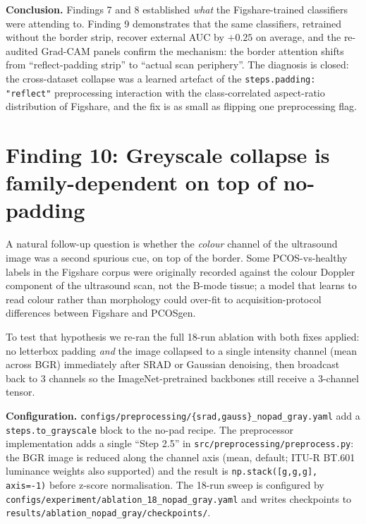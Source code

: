 \documentclass[11pt]{article}
\begin{document}
\textbf{Conclusion.} Findings 7 and 8 established \emph{what} the
Figshare-trained classifiers were attending to. Finding 9 demonstrates
that the same classifiers, retrained without the border strip, recover
external AUC by $+0.25$ on average, and the re-audited Grad-CAM
panels confirm the mechanism: the border attention shifts from
``reflect-padding strip'' to ``actual scan periphery''. The diagnosis
is closed: the cross-dataset collapse was a learned artefact of the
\texttt{steps.padding: "reflect"} preprocessing interaction with the
class-correlated aspect-ratio distribution of Figshare, and the fix is
as small as flipping one preprocessing flag.

\clearpage

\section{Finding 10: Greyscale collapse is family-dependent on top of no-padding}
\label{sec:no-pad-gray}

A natural follow-up question is whether the \emph{colour} channel of
the ultrasound image was a second spurious cue, on top of the border.
Some PCOS-vs-healthy labels in the Figshare corpus were originally
recorded against the colour Doppler component of the ultrasound scan,
not the B-mode tissue; a model that learns to read colour rather than
morphology could over-fit to acquisition-protocol differences between
Figshare and PCOSgen.

To test that hypothesis we re-ran the full 18-run ablation with both
fixes applied: no letterbox padding \emph{and} the image collapsed to a
single intensity channel (mean across BGR) immediately after SRAD or
Gaussian denoising, then broadcast back to 3 channels so the
ImageNet-pretrained backbones still receive a 3-channel tensor.

\textbf{Configuration.} \texttt{configs/preprocessing/\{srad,gauss\}\_nopad\_gray.yaml}
add a \texttt{steps.to\_grayscale} block to the no-pad recipe. The
preprocessor implementation adds a single ``Step 2.5'' in
\texttt{src/preprocessing/preprocess.py}: the BGR image is reduced
along the channel axis (mean, default; ITU-R BT.601 luminance weights
also supported) and the result is \texttt{np.stack([g,g,g], axis=-1)}
before z-score normalisation. The 18-run sweep is configured by
\texttt{configs/experiment/ablation\_18\_nopad\_gray.yaml} and writes
checkpoints to \texttt{results/ablation\_nopad\_gray/checkpoints/}.
\end{document}
